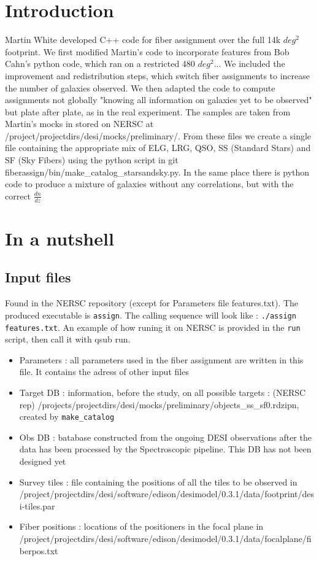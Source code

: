 \documentclass{extarticle}
\def\sqd{$deg^{2}$}
\begin{document}
\section{Introduction}
Martin White developed C++ code for fiber assignment over the full 14k \sqd footprint.  We first modified Martin's code to incorporate features from Bob Cahn's python code, which ran on a restricted 480 \sqd... We included the improvement and redistribution steps, which switch fiber assignments to increase the number of galaxies observed. We then adapted the code to compute assignments not globally "knowing all information on galaxies yet to be observed" but plate after plate, as in the real experiment.
The samples are taken from Martin's mocks in stored on NERSC at /project/projectdirs/desi/mocks/preliminary/. From these files we create a single file containing the appropriate mix of ELG, LRG, QSO, SS (Standard Stars) and SF (Sky Fibers) using the python script in git fiberassign/bin/make\_catalog\_starsandsky.py. In the same place there is python code to produce a mixture of galaxies without any correlations, but with the correct $\frac{dn}{dz}$  
  
\section{In a nutshell}
\subsection{Input files}
Found in the NERSC repository (except for Parameters file features.txt).
The produced executable is {\tt assign}. The calling sequence will look like :
{\tt./assign features.txt}. An example of how runing it on NERSC is provided in the {\tt run} script, then call it with qsub run.

\begin{itemize} 
	\item Parameters : all parameters used in the fiber assignment are written in this file. It contains the adress of other input files
	\item Target DB : information, before the study, on all possible targets : (NERSC rep) /projects/projectdirs/desi/mocks/preliminary/objects\_ss\_sf0.rdzipn, created by {\tt make\_catalog}
	\item Obs DB : batabase constructed from the ongoing DESI observations after the data has been processed by the Spectroscopic pipeline. This DB has not been designed yet
	\item Survey tiles : file containing the positions of all the tiles to be observed in /project/projectdirs/desi/software/edison/desimodel/0.3.1/data/footprint/desi-tiles.par
	\item Fiber positions : locations of the positioners in the focal plane in /project/projectdirs/desi/software/edison/desimodel/0.3.1/data/focalplane/fiberpos.txt
\end{itemize} 
\end{document}
